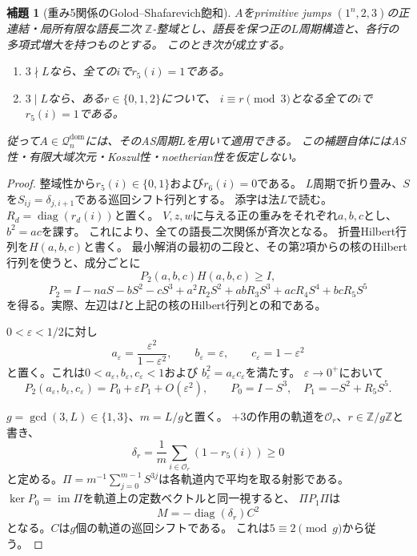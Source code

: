 \documentclass[11pt,a4paper]{ltjsarticle}
\newtheorem{lemma}[theorem]{補題}
\theoremstyle{definition}
\begin{document}
\begin{lemma}[重み5関係のGolod--Shafarevich飽和]
\label{genidx:lem:r5-gs-saturation}
$A$をprimitive jumps $(1^n,2,3)$の正連結・局所有限な語長二次
$\mathbb Z$-整域とし、語長を保つ正の$L$周期構造と、各行の多項式増大を持つものとする。
このとき次が成立する。
\begin{enumerate}
\item $3\nmid L$なら、全ての$i$で$r_5(i)=1$である。
\item $3\mid L$なら、ある$r\in\{0,1,2\}$について、
$i\equiv r\pmod3$となる全ての$i$で$r_5(i)=1$である。
\end{enumerate}
従って$A\in\mathcal Q_n^{\mathrm{dom}}$には、そのAS周期$L$を用いて適用できる。
この補題自体にはAS性・有限大域次元・Koszul性・noetherian性を仮定しない。
\end{lemma}
\begin{proof}
整域性から$r_5(i)\in\{0,1\}$および$r_6(i)=0$である。
$L$周期で折り畳み、$S$を$S_{ij}=\delta_{j,i+1}$である巡回シフト行列とする。
添字は法$L$で読む。$R_d=\operatorname{diag}(r_d(i))$と置く。
$V,z,w$に与える正の重みをそれぞれ$a,b,c$とし、$b^2=ac$を課す。
これにより、全ての語長二次関係が斉次となる。
折畳Hilbert行列を$H(a,b,c)$と書く。
最小解消の最初の二段と、その第2項からの核のHilbert行列を使うと、成分ごとに
\begin{equation}\label{genidx:eq:r5-gs-inequality}
P_2(a,b,c)H(a,b,c)\ge I,
\end{equation}
\[
P_2=I-naS-bS^2-cS^3
 +a^2R_2S^2+abR_3S^3+acR_4S^4+bcR_5S^5
\]
を得る。実際、左辺は$I$と上記の核のHilbert行列との和である。

$0<\varepsilon<1/2$に対し
\[
a_\varepsilon=\frac{\varepsilon^2}{1-\varepsilon^2},\qquad
b_\varepsilon=\varepsilon,\qquad c_\varepsilon=1-\varepsilon^2
\]
と置く。これは$0<a_\varepsilon,b_\varepsilon,c_\varepsilon<1$および
$b_\varepsilon^2=a_\varepsilon c_\varepsilon$を満たす。
$\varepsilon\to0^+$において
\[
P_2(a_\varepsilon,b_\varepsilon,c_\varepsilon)
=P_0+\varepsilon P_1+O(\varepsilon^2),
\qquad
P_0=I-S^3,\quad P_1=-S^2+R_5S^5.
\]

$g=\gcd(3,L)\in\{1,3\}$、$m=L/g$と置く。
$+3$の作用の軌道を$\mathcal O_r$、$r\in\mathbb Z/g\mathbb Z$と書き、
\[
\delta_r=\frac1m\sum_{i\in\mathcal O_r}(1-r_5(i))\ge0
\]
と定める。$\Pi=m^{-1}\sum_{j=0}^{m-1}S^{3j}$は各軌道内で平均を取る射影である。
$\ker P_0=\operatorname{im}\Pi$を軌道上の定数ベクトルと同一視すると、
$\Pi P_1\Pi$は
\[
M=-\operatorname{diag}(\delta_r)C^2
\]
となる。$C$は$g$個の軌道の巡回シフトである。
これは$5\equiv2\pmod g$から従う。


\end{proof}
\end{document}
